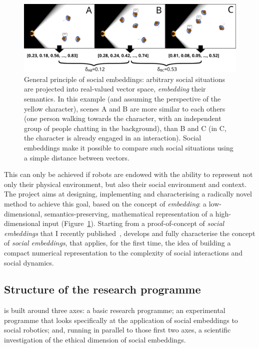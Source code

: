 \begin{figure}[H]
    \centering
    \includegraphics[width=0.9\linewidth]{figs/social-embeddings}
    \caption{General principle of social embeddings: arbitrary social situations
    are projected into real-valued vector space, \emph{embedding} their
    semantics. In this example (and assuming the perspective of the yellow
    character), scenes A and B  are more similar to each others (one person walking towards the
    character, with an independent group of people chatting in the background),
    than B and C (in C, the character is already engaged in an interaction).
    Social embeddings make it possible to compare such social situations using
    a simple distance between vectors.}
    \label{fig:social-embeddings}
\end{figure}

This can only be achieved if robots are endowed with the ability to represent
not only their physical environment, but also their social environment and
context. The \project project aims at designing, implementing and characterising
a radically novel method to achieve this goal, based on the concept of
\emph{embedding}: a low-dimensional, semantics-preserving, mathematical
representation of a high-dimensional input (Figure~\ref{fig:social-embeddings}).
Starting from a proof-of-concept of \emph{social embeddings} that I recently
published~\cite{lemaignan2024social}, \project develops and fully characterise
the concept of \emph{social embeddings}, that applies, for the first time, the
idea of building a compact numerical representation to the complexity of social
interactions and social dynamics.


\subsection{Structure of the research programme}

\project is built around three axes: a basic research programme; an experimental
programme that looks specifically at the application of social embeddings to
social robotics; and, running in parallel to those first two axes, a scientific
investigation of the ethical dimension of social embeddings.

